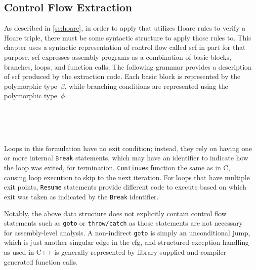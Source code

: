 \subsection{Control Flow Extraction}\label{sse:cfg_extract}
As described in \cref{se:hoare},
in order to apply  that utilizes Hoare rules to verify a Hoare triple,
there must be some syntactic structure to apply those rules to.
This chapter uses a syntactic representation of control flow called \ac{scf}
in part for that purpose.
\Ac{scf} expresses assembly programs as a combination of basic blocks,
branches, loops, and function calls.
The following grammar provides a description of \ac{scf}
produced by the extraction code.
Each basic block is represented by the polymorphic type~$\beta$,%
while branching conditions are represented using the polymorphic type~$\phi$.%
\begin{bnf}
   \\
   \\
   \\
\end{bnf}
Loops in this formulation have no exit condition;%
instead, they rely on having one or more internal \texttt{Break} statements,%
which may have an identifier to indicate how the loop was exited, for termination.
\texttt{Continue}s function the same as in C,%
causing loop execution to skip to the next iteration.
For loops that have multiple exit points,
\texttt{Resume} statements provide different code to execute
based on which exit was taken as indicated by the \texttt{Break} identifier.

Notably, the above data structure does not explicitly contain
control flow statements such as \texttt{goto} or \texttt{throw/catch}
as those statements are not necessary for assembly-level analysis.
A non-indirect \texttt{goto} is simply an unconditional jump,
which is just another singular edge in the \ac{cfg},
and structured exception handling as used in C++ is generally represented
by library-supplied and compiler-generated function calls.

